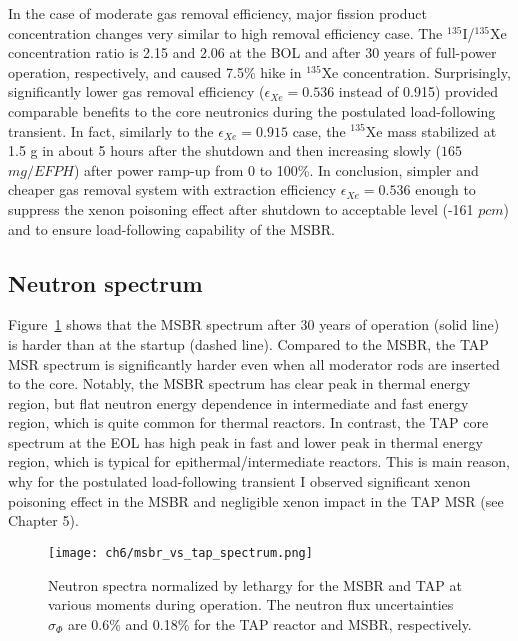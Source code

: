 In the case of moderate gas removal efficiency, major fission product 
concentration changes very similar to high removal efficiency case. The 
$^{135}$I/$^{135}$Xe concentration ratio is 2.15 and 2.06 at the \gls{BOL} and 
after 30 years of full-power operation, respectively, and caused 7.5\% hike 
in $^{135}$Xe concentration. Surprisingly, significantly lower gas removal 
efficiency ($\epsilon_{Xe}=0.536$ instead of 0.915) provided comparable 
benefits to the core neutronics during the postulated load-following 
transient. In fact, similarly to the $\epsilon_{Xe}=0.915$ case, the 
$^{135}$Xe mass stabilized at 1.5 g in about 5 hours after the shutdown and 
then increasing slowly ($165$ $mg/EFPH$) after power ramp-up from 0 to 100\%.
In conclusion, simpler and cheaper gas removal system with extraction 
efficiency $\epsilon_{Xe}=0.536$ enough to suppress the xenon poisoning effect 
after shutdown to acceptable level (-161 $pcm$) and to ensure load-following 
capability of the \gls{MSBR}.


\subsection{Neutron spectrum}
Figure~\ref{fig:ch6-msbr-spectrum} shows that the \gls{MSBR} spectrum after 30 
years of operation (solid line) is harder than at the startup (dashed line). 
Compared to the \gls{MSBR}, the \gls{TAP} \gls{MSR} spectrum is significantly 
harder even when all moderator rods are inserted to the core. Notably, the 
\gls{MSBR} spectrum has clear peak in thermal energy region, but flat neutron 
energy dependence in intermediate and fast energy region, which is quite 
common for thermal reactors. In contrast, the \gls{TAP} core spectrum at the 
\gls{EOL} has high peak in fast and lower peak in thermal energy region, 
which is typical for epithermal/intermediate reactors. This is main reason, 
why for the postulated load-following transient I observed significant xenon 
poisoning effect in the \gls{MSBR} and negligible xenon impact in the 
\gls{TAP} \gls{MSR} (see Chapter 5).
\begin{figure}[htbp!] %
	\centering
	\texttt{[image: ch6/msbr\_vs\_tap\_spectrum.png]}
	\caption{Neutron spectra normalized by lethargy for the \gls{MSBR} and 
		\gls{TAP} at various moments during operation. The neutron flux 
		uncertainties $\sigma_{\Phi}$ are 0.6\% and 0.18\% for the \gls{TAP} 
		reactor and \gls{MSBR}, respectively.}
	\label{fig:ch6-msbr-spectrum}
\end{figure}


